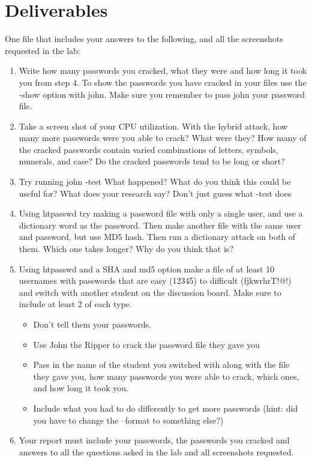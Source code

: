 \documentclass[12pt]{article}
\begin{document}
\section*{Deliverables}
One file that includes your answers to the following, and all the screenshots requested in the lab:
\begin{enumerate}
    \item Write how many passwords you cracked, what they were and how long it took you from step 4. To show the passwords you have cracked in your files use the -show option with john.  Make sure you remember to pass john your password file. 
    \item Take a screen shot of your CPU utilization. With the hybrid attack, how many more passwords were you able to crack? What were they? How many of the cracked passwords contain varied combinations of letters, symbols, numerals, and case? Do the cracked passwords tend to be long or short? 
    \item Try running john -test What happened? What do you think this could be useful for?  What does your research say? Don't just guess what -test does
    \item  Using htpasswd try making a password file with only a single user, and use a dictionary word as the password.  Then make another file with the same user and password, but use MD5 hash. Then run a dictionary attack on both of them. Which one takes longer? Why do you think that is?
    \item Using htpasswd and a SHA and md5 option make a file of at least 10 usernames with passwords that are easy (12345) to difficult  (fjkwrhrT!@!) and switch with another student on the discussion board. Make sure to include at least 2 of each type.  
    \begin{itemize}
        \item Don't tell them your passwords.
        \item  Use John the Ripper to crack the password file they gave you
        \item Pass in the name of the student you switched with along with the file they gave you, how many passwords you were able to crack, which ones, and how long it took you.
        \item Include what you had to do differently to get more passwords (hint: did you have to change the --format to something else?)
    \end{itemize}
    \item Your report must include your passwords, the passwords you cracked and answers to all the questions asked in the lab and all screenshots requested.
\end{enumerate}
\end{document}
